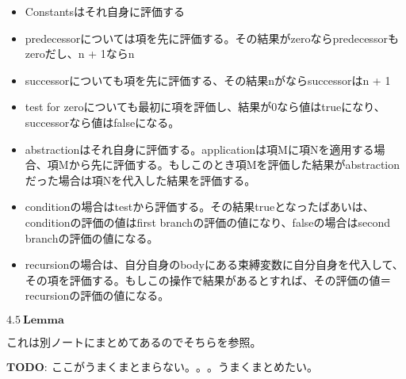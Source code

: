 \documentclass[9pt,fleqn]{jarticle}
\begin{document}
\hrulefill

\begin{itemize}
	\item Constantsはそれ自身に評価する
	\item predecessorについては項を先に評価する。その結果がzeroならpredecessorもzeroだし、n + 1ならn
	\item successorについても項を先に評価する、その結果nがならsuccessorはn + 1
	\item test for zeroについても最初に項を評価し、結果が0なら値はtrueになり、successorなら値はfalseになる。
	\item abstractionはそれ自身に評価する。applicationは項Mに項Nを適用する場合、項Mから先に評価する。もしこのとき項Mを評価した結果がabstractionだった場合は項Nを代入した結果を評価する。
	\item conditionの場合はtestから評価する。その結果trueとなったばあいは、conditionの評価の値はfirst branchの評価の値になり、falseの場合はsecond branchの評価の値になる。
	\item recursionの場合は、自分自身のbodyにある束縛変数に自分自身を代入して、その項を評価する。もしこの操作で結果があるとすれば、その評価の値＝recursionの評価の値になる。
\end{itemize}

\nl

$\bm{4.5\ Lemma}$

これは別ノートにまとめてあるのでそちらを参照。

\nl
\nl
$\bm{TODO:\ ここがうまくまとまらない。。。うまくまとめたい。}$
\nl
\nl
\end{document}

